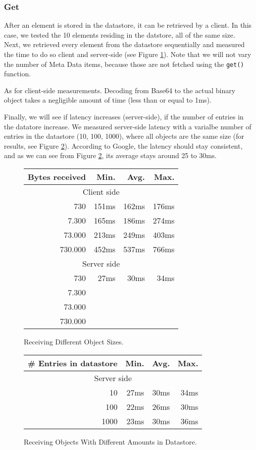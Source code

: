 \subsubsection{Get}
After an element is stored in the datastore, it can be retrieved by a client.
In this case, we tested the 10 elements residing in the datstore, all of the
same size. Next, we retrieved every element from the datastore sequentially and
measured the time to do so client and server-side (see Figure
\ref{get-obj-size}). Note that we will not vary the number of Meta Data items,
because those are not fetched using the \texttt{get()} function.

As for client-side measurements. Decoding from Base64 to the actual binary
object takes a negligible amount of time (less than or equal to 1ms).

Finally, we will see if latency increases (server-side), if the number of
entries in the datatore increase. We measured server-side latency with a
varialbe number of entries in the datastore (10, 100, 1000), where all objects
are the same size (for results, see Figure \ref{get-obj-amt}). According to
Google, the latency should stay consistent, and as we can see from Figure
\ref{get-obj-amt}, its average stays around 25 to 30ms.

\begin{figure}
\begin{tabular}{|r|r|r|r|}
\hline
Bytes received & Min. & Avg. & Max. \\
\hline
\multicolumn{4}{|c|}{Client side} \\
\hline
730 & 151ms & 162ms & 176ms \\
7.300 & 165ms & 186ms & 274ms \\
73.000 & 213ms & 249ms & 403ms \\
730.000 & 452ms & 537ms & 766ms \\
\hline
\multicolumn{4}{|c|}{Server side} \\
\hline
730 & 27ms & 30ms & 34ms \\
7.300 &  \\
73.000 &  \\
730.000 &  \\
\hline
\end{tabular}
\caption{Receiving Different Object Sizes. \label{get-obj-size}}
\end{figure}

\begin{figure}
\begin{tabular}{|r|r|r|r|}
\hline
\# Entries in datastore & Min. & Avg. & Max. \\
\hline
\multicolumn{4}{|c|}{Server side} \\
\hline
10 & 27ms & 30ms & 34ms \\
100 & 22ms & 26ms & 30ms \\
1000 & 23ms & 30ms & 36ms \\
\hline
\end{tabular}
\caption{Receiving Objects With Different Amounts in Datastore.
\label{get-obj-amt}}
\end{figure}


